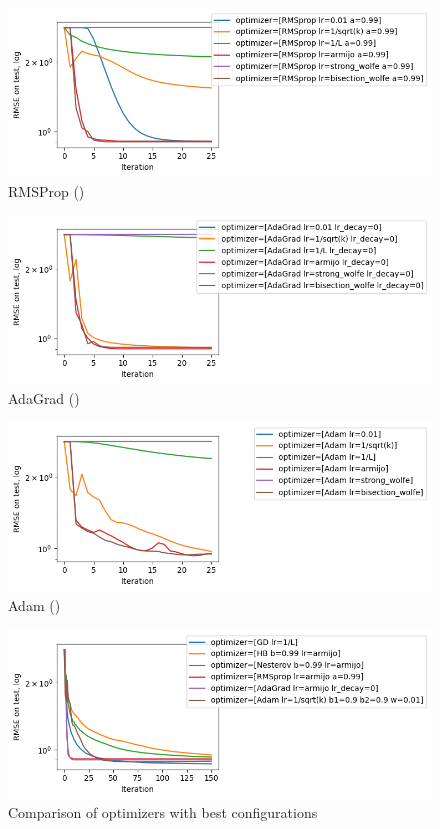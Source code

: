 \documentclass{article}
\begin{document}
\begin{figure}[H]
  \centering
  \includegraphics[width=\textwidth,keepaspectratio]{../data/rmsprop.png}
  \caption[RMSProp]{RMSProp ()}\label{fig:rmsprop}
\end{figure}

\begin{figure}[H]
  \centering
  \includegraphics[width=\textwidth,keepaspectratio]{../data/adagrad.png}
  \caption[AdaGrad]{AdaGrad ()}\label{fig:adagrad}
\end{figure}

\begin{figure}[H]
  \centering
  \includegraphics[width=\textwidth,keepaspectratio]{../data/adam.png}
  \caption[Adam]{Adam ()}\label{fig:adam}
\end{figure}

\begin{figure}[H]
  \centering
  \includegraphics[width=\textwidth,keepaspectratio]{../data/comparison.png}
  \caption[Comparison]{Comparison of optimizers with best configurations}\label{fig:comparison}
\end{figure}
\end{document}
